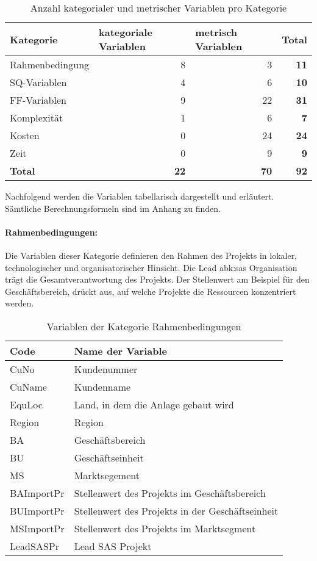 \begin{table}[htbp]
	\centering
	\caption{Anzahl kategorialer und metrischer Variablen pro Kategorie}
	\begin{tabular}{lrr|r}
		\toprule
		Kategorie & \multicolumn{1}{l}{kategoriale Variablen} & \multicolumn{1}{l}{metrisch Variablen} & \multicolumn{1}{l}{\textbf{Total}} \\
		\midrule
		Rahmenbedingung & 8     & 3     & \textbf{11} \\
		SQ-Variablen & 4     & 6     & \textbf{10} \\
		FF-Variablen & 9    & 22    & \textbf{31} \\
		Komplexität & 1     & 6     & \textbf{7} \\
		Kosten  & 0     & 24    & \textbf{24} \\
		Zeit  & 0     & 9     & \textbf{9} \\
		\bottomrule
		\textbf{Total} & \textbf{22} & \textbf{70} & \textbf{92} \\
	\end{tabular}%
	\label{tab:katmet}%
\end{table}%
Nachfolgend werden die Variablen tabellarisch dargestellt und erläutert. Sämtliche Berechnungsformeln sind im Anhang zu finden. 
\paragraph{Rahmenbedingungen:} Die Variablen dieser Kategorie definieren den Rahmen des Projekts in lokaler, technologischer und organisatorischer Hinsicht. Die Lead \gls{abk:sas} Organisation trägt die Gesamtverantwortung des Projekts. Der Stellenwert am Beispiel für den Geschäftsbereich, drückt aus, auf welche Projekte die Ressourcen konzentriert werden.
\begin{table}[htbp]
	\centering
	\caption{Variablen der Kategorie Rahmenbedingungen}
	\begin{tabular}{ll}
		\toprule
		\textbf{Code} & \textbf{Name der Variable} \\
		\midrule
		CuNo  & Kundenummer \\
		CuName & Kundenname \\
		EquLoc & Land, in dem die Anlage gebaut wird \\
		Region & Region \\
		BA    & Geschäftsbereich \\
		BU    & Geschäftseinheit \\
		MS    & Marktsegement \\
		BAImportPr & Stellenwert des Projekts im Geschäftsbereich \\
		BUImportPr & Stellenwert des Projekts in der Geschäftseinheit \\
		MSImportPr & Stellenwert des Projekts im Marktsegment \\
		LeadSASPr & Lead SAS Projekt\\
		\bottomrule
	\end{tabular}%
	\label{tab:rahm}%
\end{table}%
